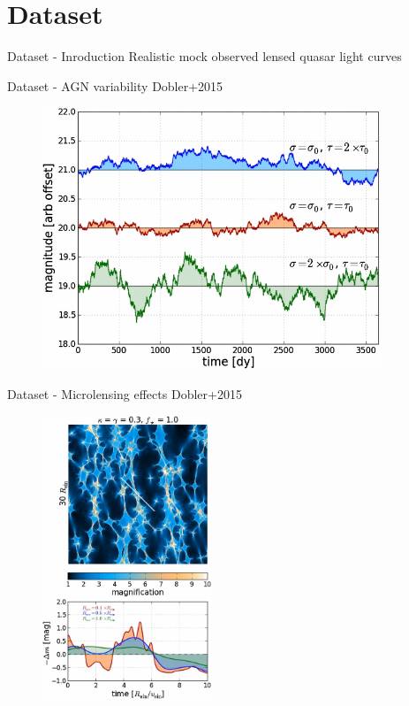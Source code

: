 \documentclass[9pt]{beamer}
\begin{document}
\section{Dataset}

\begin{frame}{Dataset - Inroduction}
  Realistic mock observed lensed quasar light curves
\end{frame}

\begin{frame}{Dataset - AGN variability}
  \hspace{0.8\textwidth}\small{Dobler+2015}
  \begin{figure}
    \includegraphics[width=0.9\textwidth]{dataset-original.jpg}
  \end{figure}
\end{frame}

\begin{frame}{Dataset - Microlensing effects}
  \hspace{0.57\textwidth}\small{Dobler+2015}
  \begin{figure}
    \includegraphics[width=0.45\textwidth]{dataset-microlensing.jpg}
  \end{figure}
\end{frame}
\end{document}
